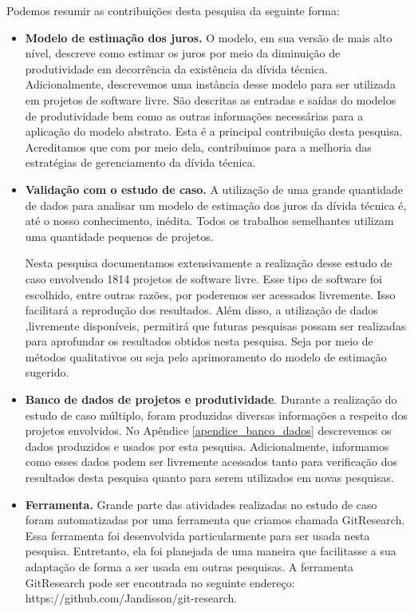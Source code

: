 Podemos resumir as contribuições desta pesquisa da seguinte forma:

\begin{itemize}
\item \textbf{Modelo de estimação dos juros.} O modelo, em sua versão de mais alto nível, descreve como estimar os juros por meio da diminuição de produtividade em decorrência da existência da dívida técnica. Adicionalmente, descrevemos uma instância desse modelo para ser utilizada em projetos de software livre. São descritas as entradas e saídas do modelos de produtividade bem como as outras informações necessárias para a aplicação do modelo abstrato. Esta é a principal contribuição desta pesquisa. Acreditamos que com por meio dela, contribuimos para a melhoria das estratégias de gerenciamento da dívida técnica. 
\item \textbf{Validação com o estudo de caso.} A utilização de uma grande quantidade de dados para analisar um modelo de estimação dos juros da dívida técnica é, até o nosso conhecimento, inédita. Todos os trabalhos semelhantes utilizam uma quantidade pequenos de projetos. 

Nesta pesquisa documentamos extensivamente a realização desse estudo de caso envolvendo 1814 projetos de software livre. Esse tipo de software foi escolhido, entre outras razões, por poderemos ser acessados livremente. Isso facilitará a reprodução dos resultados. Além disso, a utilização de dados ,livremente disponíveis, permitirá que futuras pesquisas possam ser realizadas para aprofundar os resultados obtidos nesta pesquisa. Seja por meio de métodos qualitativos ou seja pelo aprimoramento do modelo de estimação sugerido. 
\item \textbf{Banco de dados de projetos e produtividade}. Durante a realização do estudo de caso múltiplo, foram produzidas diversas informações a respeito dos projetos envolvidos. No Apêndice \ref{apendice_banco_dados} descrevemos os dados produzidos e usados por esta pesquisa. Adicionalmente, informamos como esses dados podem ser livremente acessados tanto para verificação dos resultados desta pesquisa quanto para serem utilizados em novas pesquisas.
\item \textbf{Ferramenta.} Grande parte das atividades realizadas no estudo de caso foram automatizadas por uma ferramenta que criamos chamada GitResearch. Essa ferramenta foi desenvolvida particularmente para ser usada nesta pesquisa. Entretanto, ela foi planejada de uma maneira que facilitasse a sua adaptação  de forma a ser usada em outras pesquisas. A ferramenta GitResearch pode ser encontrada no seguinte endereço: https://github.com/Jandisson/git-research.
\end{itemize}

